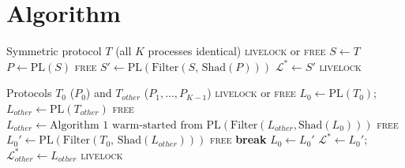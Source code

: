 \documentclass{article}
\newcommand{\Ls}{\mathcal{L}^{*}}
\newcommand{\PL}{\mathrm{PL}}
\newcommand{\Shad}{\mathrm{Shad}}
\newcommand{\Filter}{\mathrm{Filter}}
\begin{document}
\section{Algorithm}

\begin{algorithm}[h]
\caption{Algorithm~1: Symmetric livelock decision}
\label{alg:main}
\begin{algorithmic}[1]
\Require Symmetric protocol $T$ (all $K$ processes identical)
\Ensure \textsc{livelock} or \textsc{free}
\State $S \leftarrow T$
\Repeat
  \State $P \leftarrow \PL(S)$
    \hfill{}
   \Return \textsc{free} \EndIf
  \State $S' \leftarrow \PL(\Filter(S,\,\Shad(P)))$
    \hfill{}
\State $\Ls \leftarrow S'$
\Return \textsc{livelock}
\end{algorithmic}
\end{algorithm}

\begin{algorithm}[h]
\caption{Algorithm~2: $(1,1)$-Asymmetric livelock decision}
\label{alg:asym}
\begin{algorithmic}[1]
\Require Protocols $T_0$ ($P_0$) and $T_{\mathit{other}}$ ($P_1,\ldots,P_{K-1}$)
\Ensure \textsc{livelock} or \textsc{free}
\State $L_0 \leftarrow \PL(T_0)$;\quad
       $L_{\mathit{other}} \leftarrow \PL(T_{\mathit{other}})$
  \Return \textsc{free}
\EndIf
{} \hfill{}
  \State {}
  \State $L_{\mathit{other}} \leftarrow
    \text{Algorithm~1 warm-started from }
    \PL(\Filter(L_{\mathit{other}},\Shad(L_0)))$
   \Return \textsc{free} \EndIf
  \State {}
  \State $L_0' \leftarrow \PL(\Filter(T_0,\,\Shad(L_{\mathit{other}})))$
   \Return \textsc{free} \EndIf
   \textbf{break}
    \hfill{}
  \EndIf
  \State $L_0 \leftarrow L_0'$
    \hfill{}
\EndWhile
\State $\Ls \leftarrow L_0'$;\quad $\Ls_{\mathit{other}} \leftarrow L_{\mathit{other}}$
\Return \textsc{livelock}
\end{algorithmic}
\end{algorithm}
\end{document}
